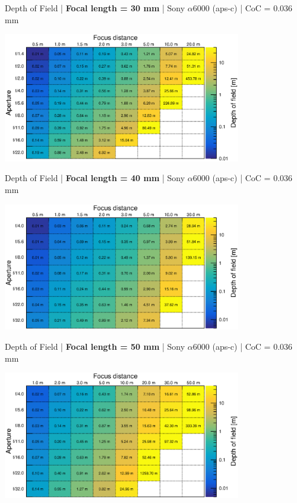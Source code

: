 \documentclass[aspectratio=169]{beamer}
\begin{document}
\begin{frame}[plain]{}
  \vspace{1ex}
  \centering
  Depth of Field | {\bf Focal length = 30 mm} |  Sony $\alpha$\hspace{0.1em}6000 (aps-c) | CoC = 0.036 mm
  
  \includegraphics[center,width=0.78\textwidth]{img/depth-of-field_focl30.eps}
\end{frame}

\begin{frame}[plain]{}
  \vspace{1ex}
  \centering
  Depth of Field | {\bf Focal length = 40 mm} |  Sony $\alpha$\hspace{0.1em}6000 (aps-c) | CoC = 0.036 mm
  
  \includegraphics[center,width=0.78\textwidth]{img/depth-of-field_focl40.eps}
\end{frame}

\begin{frame}[plain]{}
  \vspace{1ex}
  \centering
  Depth of Field | {\bf Focal length = 50 mm} |  Sony $\alpha$\hspace{0.1em}6000 (aps-c) | CoC = 0.036 mm
  
  \includegraphics[center,width=0.78\textwidth]{img/depth-of-field_focl50.eps}
\end{frame}
\end{document}
